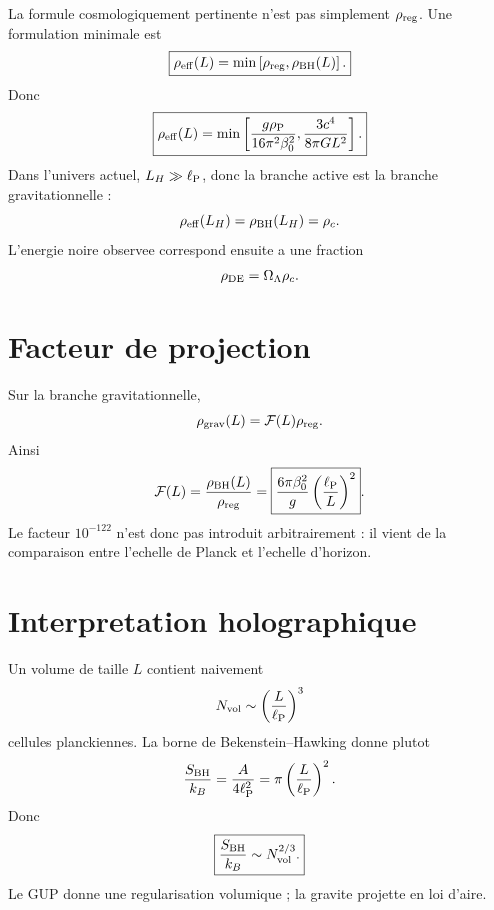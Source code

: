 \documentclass[11pt,a4paper]{article}
\newcommand{\rhoP}{\rho_{\rm P}}
\newcommand{\ellP}{\ell_{\rm P}}
\newcommand{\rhoDE}{\rho_{\rm DE}}
\newcommand{\rhoReg}{\rho_{\rm reg}}
\newcommand{\rhoBH}{\rho_{\rm BH}}
\newcommand{\LH}{L_H}
\begin{document}
La formule cosmologiquement pertinente n'est pas simplement $\rhoReg$. Une
formulation minimale est
\begin{equation}
\boxed{
\rho_{\rm eff}(L)
=
\min\left[
\rhoReg,
\rhoBH(L)
\right].
}
\label{eq:rho_eff_min}
\end{equation}
Donc
\begin{equation}
\boxed{
\rho_{\rm eff}(L)
=
\min\left[
\frac{g\rhoP}{16\pi^2\beta_0^2},
\frac{3c^4}{8\pi GL^2}
\right].
}
\end{equation}
Dans l'univers actuel, $\LH\gg\ellP$, donc la branche active est la branche
gravitationnelle :
\begin{equation}
\rho_{\rm eff}(\LH)=\rhoBH(\LH)=\rho_c.
\end{equation}
L'energie noire observee correspond ensuite a une fraction
\begin{equation}
\rhoDE=\Omega_\Lambda\rho_c.
\end{equation}

\section{Facteur de projection}

Sur la branche gravitationnelle,
\begin{equation}
\rho_{\rm grav}(L)=\mathcal{F}(L)\rhoReg.
\end{equation}
Ainsi
\begin{equation}
\mathcal{F}(L)=\frac{\rhoBH(L)}{\rhoReg}
=
\boxed{
\frac{6\pi\beta_0^2}{g}
\left(\frac{\ellP}{L}\right)^2
}.
\label{eq:projection_factor}
\end{equation}
Le facteur $10^{-122}$ n'est donc pas introduit arbitrairement : il vient de la
comparaison entre l'echelle de Planck et l'echelle d'horizon.

\section{Interpretation holographique}

Un volume de taille $L$ contient naivement
\begin{equation}
N_{\rm vol}\sim\left(\frac{L}{\ellP}\right)^3
\end{equation}
cellules planckiennes. La borne de Bekenstein--Hawking donne plutot
\begin{equation}
\frac{S_{\rm BH}}{k_B}
=
\frac{A}{4\ellP^2}
=
\pi\left(\frac{L}{\ellP}\right)^2.
\end{equation}
Donc
\begin{equation}
\boxed{
\frac{S_{\rm BH}}{k_B}\sim N_{\rm vol}^{2/3}.
}
\end{equation}
Le GUP donne une regularisation volumique ; la gravite projette en loi d'aire.
\end{document}
